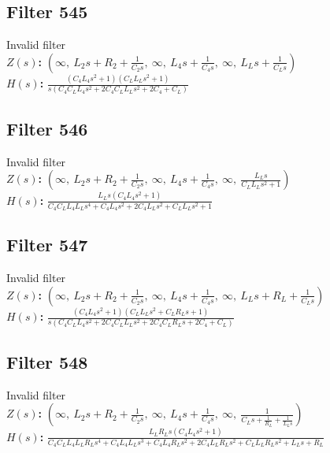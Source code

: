 \documentclass{article}
\begin{document}
\subsection*{Filter 545}
Invalid filter \\ 
\textbf{$Z(s)$:} $\left( \infty, \  L_{2} s + R_{2} + \frac{1}{C_{2} s}, \  \infty, \  L_{4} s + \frac{1}{C_{4} s}, \  \infty, \  L_{L} s + \frac{1}{C_{L} s}\right)$ \\ 
\textbf{$H(s)$:} $\frac{\left(C_{4} L_{4} s^{2} + 1\right) \left(C_{L} L_{L} s^{2} + 1\right)}{s \left(C_{4} C_{L} L_{4} s^{2} + 2 C_{4} C_{L} L_{L} s^{2} + 2 C_{4} + C_{L}\right)}$ \\ 
\subsection*{Filter 546}
Invalid filter \\ 
\textbf{$Z(s)$:} $\left( \infty, \  L_{2} s + R_{2} + \frac{1}{C_{2} s}, \  \infty, \  L_{4} s + \frac{1}{C_{4} s}, \  \infty, \  \frac{L_{L} s}{C_{L} L_{L} s^{2} + 1}\right)$ \\ 
\textbf{$H(s)$:} $\frac{L_{L} s \left(C_{4} L_{4} s^{2} + 1\right)}{C_{4} C_{L} L_{4} L_{L} s^{4} + C_{4} L_{4} s^{2} + 2 C_{4} L_{L} s^{2} + C_{L} L_{L} s^{2} + 1}$ \\ 
\subsection*{Filter 547}
Invalid filter \\ 
\textbf{$Z(s)$:} $\left( \infty, \  L_{2} s + R_{2} + \frac{1}{C_{2} s}, \  \infty, \  L_{4} s + \frac{1}{C_{4} s}, \  \infty, \  L_{L} s + R_{L} + \frac{1}{C_{L} s}\right)$ \\ 
\textbf{$H(s)$:} $\frac{\left(C_{4} L_{4} s^{2} + 1\right) \left(C_{L} L_{L} s^{2} + C_{L} R_{L} s + 1\right)}{s \left(C_{4} C_{L} L_{4} s^{2} + 2 C_{4} C_{L} L_{L} s^{2} + 2 C_{4} C_{L} R_{L} s + 2 C_{4} + C_{L}\right)}$ \\ 
\subsection*{Filter 548}
Invalid filter \\ 
\textbf{$Z(s)$:} $\left( \infty, \  L_{2} s + R_{2} + \frac{1}{C_{2} s}, \  \infty, \  L_{4} s + \frac{1}{C_{4} s}, \  \infty, \  \frac{1}{C_{L} s + \frac{1}{R_{L}} + \frac{1}{L_{L} s}}\right)$ \\ 
\textbf{$H(s)$:} $\frac{L_{L} R_{L} s \left(C_{4} L_{4} s^{2} + 1\right)}{C_{4} C_{L} L_{4} L_{L} R_{L} s^{4} + C_{4} L_{4} L_{L} s^{3} + C_{4} L_{4} R_{L} s^{2} + 2 C_{4} L_{L} R_{L} s^{2} + C_{L} L_{L} R_{L} s^{2} + L_{L} s + R_{L}}$ \\ 
\end{document}
